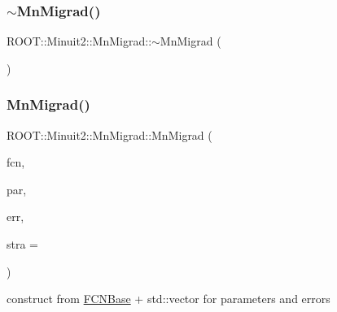 \subsubsection{\texorpdfstring{$\sim$MnMigrad()}{~MnMigrad()}\hspace{0.1cm}{\footnotesize\ttfamily [1/3]}}
{\footnotesize\ttfamily R\+O\+O\+T\+::\+Minuit2\+::\+Mn\+Migrad\+::$\sim$\+Mn\+Migrad (\begin{DoxyParamCaption}{ }\end{DoxyParamCaption})\hspace{0.3cm}{\ttfamily [inline]}}

\mbox{\label{classROOT_1_1Minuit2_1_1MnMigrad_a3a3610c55a91cb68fb3b95506ff08339}} 
\subsubsection{\texorpdfstring{MnMigrad()}{MnMigrad()}\hspace{0.1cm}{\footnotesize\ttfamily [14/39]}}
{\footnotesize\ttfamily R\+O\+O\+T\+::\+Minuit2\+::\+Mn\+Migrad\+::\+Mn\+Migrad (\begin{DoxyParamCaption}\item[{const \mbox{\hyperlink{classROOT_1_1Minuit2_1_1FCNBase}{F\+C\+N\+Base}} \&}]{fcn,  }\item[{const std\+::vector$<$ double $>$ \&}]{par,  }\item[{const std\+::vector$<$ double $>$ \&}]{err,  }\item[{unsigned int}]{stra = {} }\end{DoxyParamCaption})\hspace{0.3cm}{\ttfamily [inline]}}



construct from \mbox{\hyperlink{classROOT_1_1Minuit2_1_1FCNBase}{F\+C\+N\+Base}} + std\+::vector for parameters and errors 

\mbox{\label{classROOT_1_1Minuit2_1_1MnMigrad_a72c6740b17d24c92d0a0049d52de778e}} 
